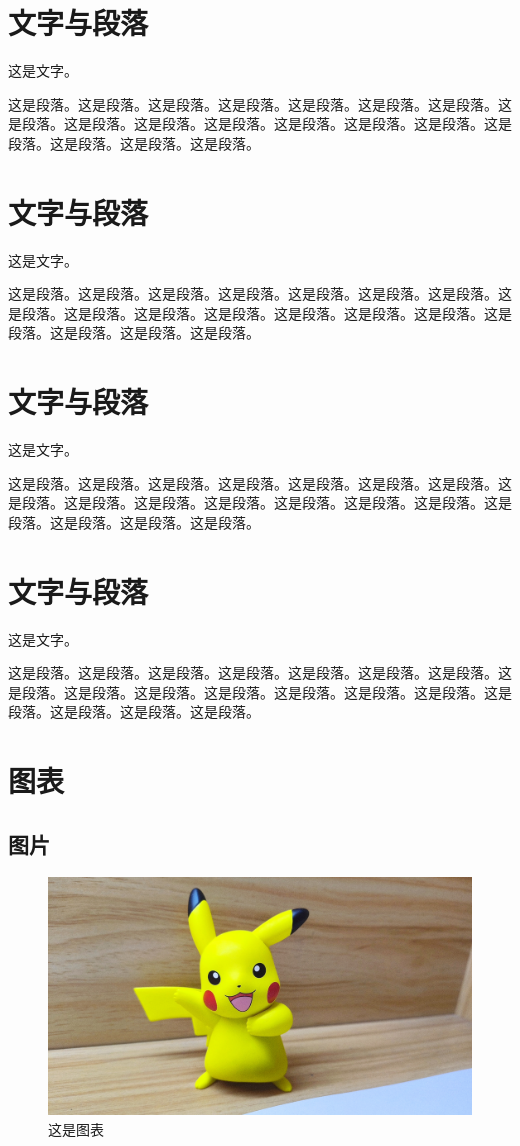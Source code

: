 \begin{ujnbody}
    \section{文字与段落}
    这是文字。

    这是段落。这是段落。这是段落。这是段落。这是段落。这是段落。这是段落。这是段落。这是段落。这是段落。这是段落。这是段落。这是段落。这是段落。这是段落。这是段落。这是段落。这是段落。
    \section{文字与段落}
    这是文字。

    这是段落。这是段落。这是段落。这是段落。这是段落。这是段落。这是段落。这是段落。这是段落。这是段落。这是段落。这是段落。这是段落。这是段落。这是段落。这是段落。这是段落。这是段落。
    \section{文字与段落}
    这是文字。

    这是段落。这是段落。这是段落。这是段落。这是段落。这是段落。这是段落。这是段落。这是段落。这是段落。这是段落。这是段落。这是段落。这是段落。这是段落。这是段落。这是段落。这是段落。
    \section{文字与段落}
    这是文字。

    这是段落。这是段落。这是段落。这是段落。这是段落。这是段落。这是段落。这是段落。这是段落。这是段落。这是段落。这是段落。这是段落。这是段落。这是段落。这是段落。这是段落。这是段落。
    \section{图表}

    \subsection{图片}

    \begin{figure}[htbp]
        \centering
        \includegraphics[scale=0.1, ]{figures/pikachu.jpg}
        \caption{这是图表}
    \end{figure}


\end{ujnbody}
